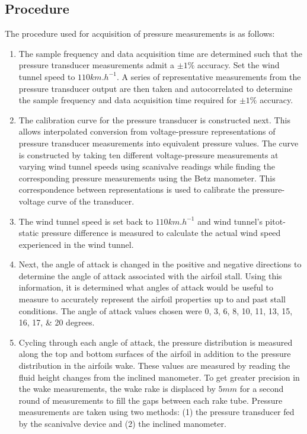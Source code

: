 \documentclass[runningheads]{llncs}
\begin{document}
\subsection{Procedure}\label{sec:procedure}


\noindent
The procedure used for acquisition of pressure measurements is as follows:

\begin{enumerate}

    \item The sample frequency and data acquisition time are determined such that the pressure transducer measurements admit a $\pm 1\%$ accuracy. Set the wind tunnel speed to $110\si{km.h^{-1}}$. A series of representative measurements from the pressure transducer output are then taken and autocorrelated to determine the sample frequency and data acquisition time required for $\pm 1\%$ accuracy.
    
    \item The calibration curve for the pressure transducer is constructed next. This allows interpolated conversion from voltage-pressure representations of pressure transducer measurements into equivalent pressure values. The curve is constructed by taking ten different voltage-pressure measurements at varying wind tunnel speeds using scanivalve readings while finding the corresponding pressure measurements using the Betz manometer. This correspondence between representations is used to calibrate the pressure-voltage curve of the transducer.
    
    \item The wind tunnel speed is set back to $110\si{km.h^{-1}}$ and wind tunnel's pitot-static pressure difference is measured to calculate the actual wind speed experienced in the wind tunnel.
    
    \item Next, the angle of attack is changed in the positive and negative directions to determine the angle of attack associated with the airfoil stall. Using this information, it is determined what angles of attack would be useful to measure to accurately represent the airfoil properties up to and past stall conditions. The angle of attack values chosen were \numlist{0;3;6;8;10;11;13;15;16;17;20} degrees.

    \item Cycling through each angle of attack, the pressure distribution is measured along the top and bottom surfaces of the airfoil in addition to the pressure distribution in the airfoils wake. These values are measured by reading the fluid height changes from the inclined manometer. To get greater precision in the wake measurements, the wake rake is displaced by $5\si{mm}$ for a second round of measurements to fill the gaps between each rake tube. Pressure measurements are taken using two methods: (1) the pressure transducer fed by the scanivalve device and (2) the inclined manometer.

\end{enumerate}
\end{document}
